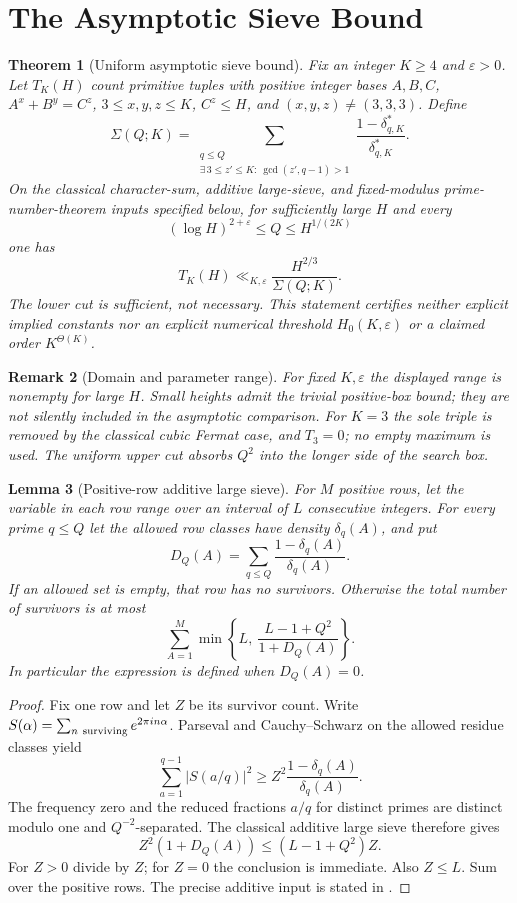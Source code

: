 \documentclass[11pt,a4paper]{article}
\newtheorem{theorem}{Theorem}[section]
\newtheorem{lemma}[theorem]{Lemma}
\newtheorem{remark}[theorem]{Remark}
\begin{document}
\section{The Asymptotic Sieve Bound}
\label{sec:sieve}

\begin{theorem}[Uniform asymptotic sieve bound]
\label{thm:sieve}
Fix an integer $K\ge4$ and $\varepsilon>0$. Let $T_K(H)$ count
primitive tuples with \emph{positive integer} bases $A,B,C$,
$A^x+B^y=C^z$, $3\le x,y,z\le K$, $C^z\le H$, and
$(x,y,z)\ne(3,3,3)$. Define
\[
 \Sigma(Q;K)=
 \sum_{\substack{q\le Q\\
      \exists\,3\le z'\le K:\ \gcd(z',q-1)>1}}
       \frac{1-\delta_{q,K}^{*}}{\delta_{q,K}^{*}}.
\]
On the classical character-sum, additive large-sieve, and fixed-modulus
prime-number-theorem inputs specified below, for sufficiently large
$H$ and every
\[
 (\log H)^{2+\varepsilon}\le Q\le H^{1/(2K)}
\]
one has
\[
 T_K(H)\ll_{K,\varepsilon}\frac{H^{2/3}}{\Sigma(Q;K)}.
\]
The lower cut is sufficient, not necessary. This statement certifies
neither explicit implied constants nor an explicit numerical threshold
$H_0(K,\varepsilon)$ or a claimed order $K^{\Theta(K)}$.
\end{theorem}

\begin{remark}[Domain and parameter range]
For fixed $K,\varepsilon$ the displayed range is nonempty for large
$H$. Small heights admit the trivial positive-box bound; they are not
silently included in the asymptotic comparison. For $K=3$ the sole
triple is removed by the classical cubic Fermat case, and $T_3=0$;
no empty maximum is used. The uniform upper cut absorbs $Q^2$ into
the longer side of the search box.
\end{remark}

\begin{lemma}[Positive-row additive large sieve]
\label{lem:LS2}
For $M$ positive rows, let the variable in each row range over an
interval of $L$ consecutive integers. For every prime $q\le Q$ let
the allowed row classes have density $\delta_q(A)$, and put
\[
 D_Q(A)=\sum_{q\le Q}\frac{1-\delta_q(A)}{\delta_q(A)}.
\]
If an allowed set is empty, that row has no survivors. Otherwise
the total number of survivors is at most
\[
 \sum_{A=1}^{M}\min\left\{L,\
       \frac{L-1+Q^2}{1+D_Q(A)}\right\}.
\]
In particular the expression is defined when $D_Q(A)=0$.
\end{lemma}

\begin{proof}
Fix one row and let $Z$ be its survivor count. Write
$S(\alpha)=\sum_{n\ {\rm surviving}}e^{2\pi i n\alpha}$.
Parseval and Cauchy--Schwarz on the allowed residue classes yield
\[
 \sum_{a=1}^{q-1}|S(a/q)|^2
       \ge Z^2\frac{1-\delta_q(A)}{\delta_q(A)}.
\]
The frequency zero and the reduced fractions $a/q$ for distinct
primes are distinct modulo one and $Q^{-2}$-separated.
The classical additive large sieve
\cite{Bombieri1971,KedlayaANT} therefore gives
\[
 Z^2(1+D_Q(A))\le(L-1+Q^2)Z.
\]
For $Z>0$ divide by $Z$; for $Z=0$ the conclusion is immediate.
Also $Z\le L$. Sum over the positive rows. The precise additive
input is stated in \cite[Theorem~18.1]{KedlayaANT}.
\end{proof}
\end{document}
